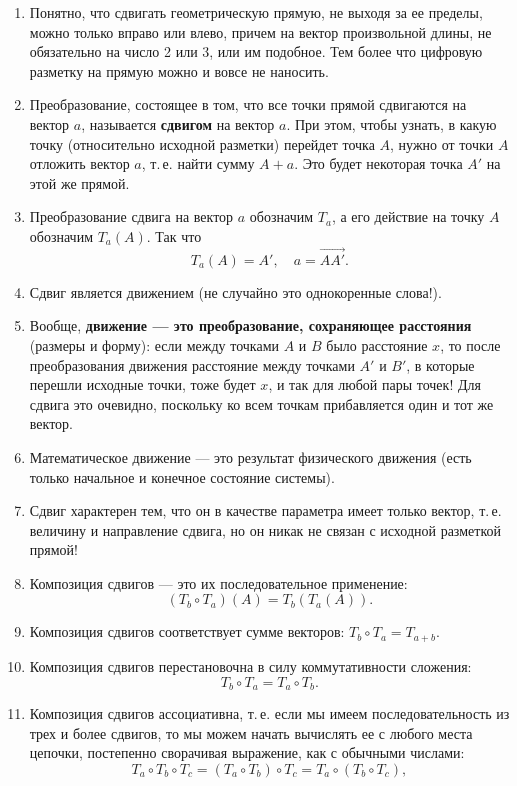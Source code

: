 \begin{enumerate}
\item Понятно, что сдвигать геометрическую прямую, не выходя за ее пределы, можно только вправо или влево, причем на вектор произвольной длины, не обязательно на число 2 или 3, или им подобное. Тем более что цифровую разметку на прямую можно и вовсе не наносить.
\item Преобразование, состоящее в том, что все точки прямой сдвигаются на вектор $a$, называется \textbf{сдвигом} на вектор $a$. При этом, чтобы узнать, в какую точку (относительно исходной разметки) перейдет точка $A$, нужно от точки $A$ отложить вектор $a$, т.\,е. найти сумму $A+a$. Это будет некоторая точка $A'$ на этой же прямой.
\item Преобразование сдвига на вектор $a$ обозначим $T_a$, а его действие на точку $A$ обозначим $T_a(A)$. Так что
$$
T_a(A)=A',\quad a=\vec{AA'}.
$$
\item Сдвиг является движением (не случайно это однокоренные слова!).
\item Вообще, \textbf{движение --- это преобразование, сохраняющее расстояния} (размеры и форму): если между точками $A$ и $B$ было расстояние $x$, то после преобразования движения расстояние между точками $A'$ и $B'$, в которые перешли исходные точки, тоже будет $x$, и так для любой пары точек! Для сдвига это очевидно, поскольку ко всем точкам прибавляется один и тот же вектор.
\item Математическое движение --- это результат физического движения (есть только начальное и конечное состояние системы).
\item Сдвиг характерен тем, что он в качестве параметра имеет только вектор, т.\,е. величину и направление сдвига, но он никак не связан с исходной разметкой прямой!
\item Композиция сдвигов --- это их последовательное применение:
\begin{equation}\label{Tcomposition}
(T_b\circ T_a)(A)=T_b(T_a(A)).
\end{equation}
\item Композиция сдвигов соответствует сумме векторов: $T_b\circ T_a=T_{a+b}$.
\item Композиция сдвигов перестановочна в силу коммутативности сложения: $$T_b\circ T_a=T_a\circ T_b.$$
\item Композиция сдвигов ассоциативна, т.\,е. если мы имеем последовательность из трех и более сдвигов, то мы можем начать вычислять ее с любого места цепочки, постепенно сворачивая выражение, как с обычными числами:
$$
T_a\circ T_b\circ T_c = (T_a\circ T_b)\circ T_c = T_a\circ (T_b\circ T_c),
$$
\end{enumerate}
